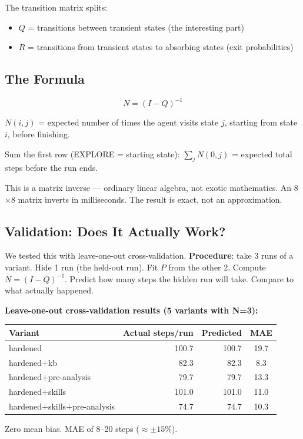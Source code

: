 \documentclass[11pt,a4paper]{article}
\begin{document}
The transition matrix splits:
\begin{itemize}
  \item $Q$ = transitions between transient states (the interesting part)
  \item $R$ = transitions from transient states to absorbing states (exit probabilities)
\end{itemize}

\subsection*{The Formula}

\begin{keybox}
\[
N = (I - Q)^{-1}
\]

$N(i, j)$ = expected number of times the agent visits state $j$,
starting from state $i$, before finishing.

Sum the first row (EXPLORE = starting state):
$\sum_j N(0, j)$ = expected total steps before the run ends.
\end{keybox}

This is a matrix inverse --- ordinary linear algebra, not exotic mathematics.
An 8$\times$8 matrix inverts in milliseconds.
The result is exact, not an approximation.

\subsection*{Validation: Does It Actually Work?}

We tested this with leave-one-out cross-validation.
\textbf{Procedure}: take 3 runs of a variant.
Hide 1 run (the held-out run).
Fit $P$ from the other 2.
Compute $N = (I-Q)^{-1}$.
Predict how many steps the hidden run will take.
Compare to what actually happened.

\begin{findingbox}
\textbf{Leave-one-out cross-validation results (5 variants with N=3):}
\vspace{6pt}
\begin{center}
\begin{tabular}{@{}lrrc@{}}
\toprule
\textbf{Variant} & \textbf{Actual steps/run} & \textbf{Predicted} & \textbf{MAE} \\
\midrule
hardened            & 100.7 & 100.7 & 19.7 \\
hardened+kb         &  82.3 &  82.3 &  8.3 \\
hardened+pre-analysis        &  79.7 &  79.7 & 13.3 \\
hardened+skills     & 101.0 & 101.0 & 11.0 \\
hardened+skills+pre-analysis &  74.7 &  74.7 & 10.3 \\
\bottomrule
\end{tabular}
\end{center}
\vspace{4pt}
Zero mean bias. MAE of 8--20 steps ($\approx \pm 15\%$).
\end{findingbox}
\end{document}
